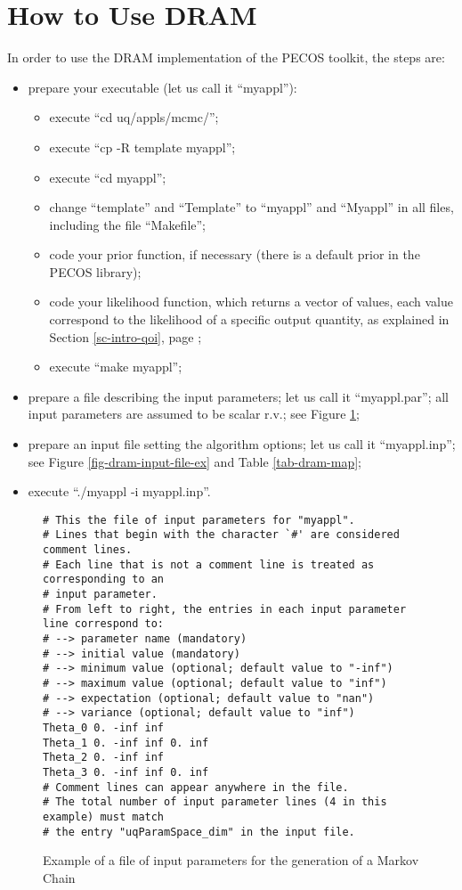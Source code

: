 \section{How to Use DRAM}\label{sc-dram-how-to-use}

In order to use the DRAM implementation of the PECOS toolkit, the steps are:
\begin{itemize}
\item {prepare your executable (let us call it ``myappl''):
\begin{itemize}
\item execute ``cd uq/appls/mcmc/'';
\item execute ``cp -R template myappl'';
\item execute ``cd myappl'';
\item change ``template'' and ``Template'' to ``myappl'' and ``Myappl'' in all files, including the file ``Makefile'';
\item code your prior function, if necessary (there is a default prior in the PECOS library);
\item code your likelihood function, which returns a vector of values, each value correspond to the likelihood of a specific output quantity, as explained in Section \ref{sc-intro-qoi}, page \pageref{sc-intro-qoi};
\item execute ``make myappl'';
\end{itemize}
}
\item prepare a file describing the input parameters; let us call it ``myappl.par''; all input parameters are assumed to be scalar r.v.; see Figure \ref{fig-dram-par-file-ex}; 
\item prepare an input file setting the algorithm options; let us call it ``myappl.inp''; see Figure \ref{fig-dram-input-file-ex} and Table \ref{tab-dram-map};
\item execute ``./myappl -i myappl.inp''.
\end{itemize}

\begin{figure}
\begin{verbatim}
# This the file of input parameters for "myappl".
# Lines that begin with the character `#' are considered comment lines.
# Each line that is not a comment line is treated as corresponding to an
# input parameter.
# From left to right, the entries in each input parameter line correspond to:
# --> parameter name (mandatory)
# --> initial value (mandatory)
# --> minimum value (optional; default value to "-inf")
# --> maximum value (optional; default value to "inf")
# --> expectation (optional; default value to "nan")
# --> variance (optional; default value to "inf")
Theta_0 0. -inf inf
Theta_1 0. -inf inf 0. inf
Theta_2 0. -inf inf
Theta_3 0. -inf inf 0. inf
# Comment lines can appear anywhere in the file.
# The total number of input parameter lines (4 in this example) must match
# the entry "uqParamSpace_dim" in the input file.
\end{verbatim}
\caption{Example of a file of input parameters for the generation of a Markov Chain}
\label{fig-dram-par-file-ex}
\end{figure}

